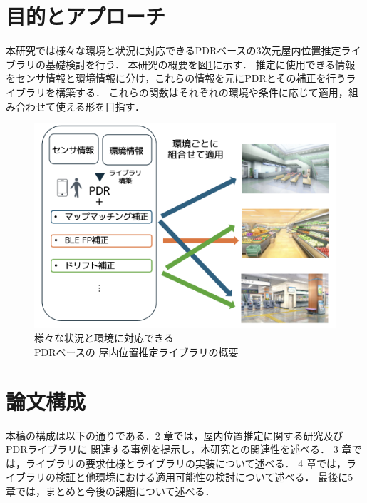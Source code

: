 \section{目的とアプローチ}

本研究では様々な環境と状況に対応できるPDRベースの3次元屋内位置推定ライブラリの基礎検討を行う．
本研究の概要を図\ref{fig:overview}に示す．
推定に使用できる情報をセンサ情報と環境情報に分け，これらの情報を元にPDRとその補正を行うライブラリを構築する．
これらの関数はそれぞれの環境や条件に応じて適用，組み合わせて使える形を目指す．

\begin{figure}[h]
	\centering
	\includegraphics[width=\linewidth]{image/first.png}

	\caption{様々な状況と環境に対応できる\\PDRベースの
		屋内位置推定ライブラリの概要}    \label{fig:overview}
\end{figure}

\section{論文構成}
本稿の構成は以下の通りである．2 章では，屋内位置推定に関する研究及びPDRライブラリに
関連する事例を提示し，本研究との関連性を述べる．
3 章では，ライブラリの要求仕様とライブラリの実装について述べる．
4 章では，ライブラリの検証と他環境における適用可能性の検討について述べる．
最後に5 章では，まとめと今後の課題について述べる．


